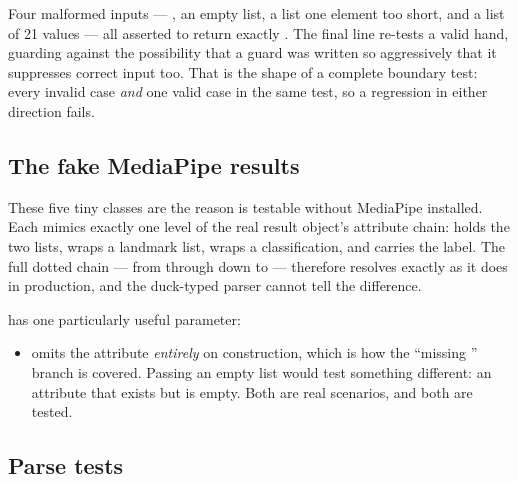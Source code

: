 \begin{codecard}

\end{codecard}

Four malformed inputs --- , an empty list, a list one element too short, and a list of 21
 values --- all asserted to return exactly . The final line re-tests a
valid hand, guarding against the possibility that a guard was written so aggressively that it
suppresses correct input too. That is the shape of a complete boundary test: every invalid case
\emph{and} one valid case in the same test, so a regression in either direction fails.

\subsection{The fake MediaPipe results}

\begin{codecard}

\end{codecard}

These five tiny classes are the reason  is testable without MediaPipe
installed. Each mimics exactly one level of the real result object's attribute chain:
 holds the two lists,  wraps a landmark list,
 wraps a classification, and  carries the
label. The full dotted chain --- from  through  down
to  --- therefore resolves exactly as it does in production, and the duck-typed parser
cannot tell the difference.

 has one particularly useful parameter:

\begin{itemize}
  \item {} omits the attribute \emph{entirely} on construction, which
        is how the ``missing '' branch is covered. Passing an empty list
        would test something different: an attribute that exists but is empty. Both are real
        scenarios, and both are tested.
\end{itemize}

\subsection{Parse tests}

